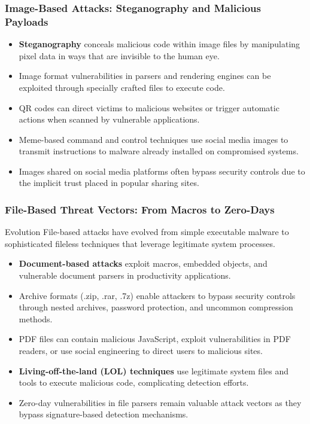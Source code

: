 \documentclass{beamer}
\begin{document}
\begin{frame}
    \frametitle{Image-Based Attacks: Steganography and Malicious Payloads}
    
    \begin{itemize}
        \item \textbf{Steganography} conceals malicious code within image files by manipulating pixel data in ways that are invisible to the human eye.
        \item Image format vulnerabilities in parsers and rendering engines can be exploited through specially crafted files to execute code.
        \item QR codes can direct victims to malicious websites or trigger automatic actions when scanned by vulnerable applications.
        \item Meme-based command and control techniques use social media images to transmit instructions to malware already installed on compromised systems.
        \item Images shared on social media platforms often bypass security controls due to the implicit trust placed in popular sharing sites.
    \end{itemize}
\end{frame}

\begin{frame}
    \frametitle{File-Based Threat Vectors: From Macros to Zero-Days}
    
    \begin{block}{Evolution}
        File-based attacks have evolved from simple executable malware to sophisticated fileless techniques that leverage legitimate system processes.
    \end{block}
    
    \begin{itemize}
        \item \textbf{Document-based attacks} exploit macros, embedded objects, and vulnerable document parsers in productivity applications.
        \item Archive formats (.zip, .rar, .7z) enable attackers to bypass security controls through nested archives, password protection, and uncommon compression methods.
        \item PDF files can contain malicious JavaScript, exploit vulnerabilities in PDF readers, or use social engineering to direct users to malicious sites.
        \item \textbf{Living-off-the-land (LOL) techniques} use legitimate system files and tools to execute malicious code, complicating detection efforts.
        \item Zero-day vulnerabilities in file parsers remain valuable attack vectors as they bypass signature-based detection mechanisms.
    \end{itemize}
\end{frame}
\end{document}
